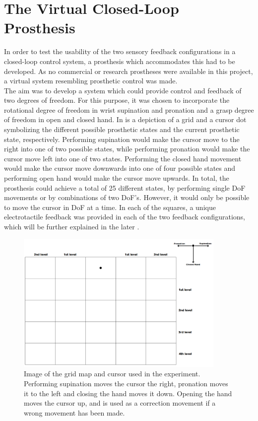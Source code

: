 
\section{The Virtual Closed-Loop Prosthesis} \label{sec:vp}

In order to test the usability of the two sensory feedback configurations in a closed-loop control system, a prosthesis which accommodates this had to be developed. As no commercial or research prostheses were available in this project, a virtual system resembling prosthetic control was made. \\
The aim was to develop a system which could provide control and feedback of two degrees of freedom. For this purpose, it was chosen to incorporate the rotational degree of freedom in wrist supination and pronation and a grasp degree of freedom in open and closed hand. In  is a depiction of a grid and a cursor dot symbolizing the different possible prosthetic states and the current prosthetic state, respectively. Performing supination would make the cursor move to the right into one of two possible states, while performing pronation would make the cursor move left into one of two states. Performing the closed hand movement would make the cursor move downwards into one of four possible states and performing open hand would make the cursor move upwards. In total, the prosthesis could achieve a total of 25 different states, by performing single DoF movements or by combinations of two DoF's. However, it would only be possible to move the cursor in DoF at a time. In each of the squares, a unique electrotactile feedback was provided in each of the two feedback configurations, which will be further explained in the later .      
     

\begin{figure}[H]                 
	\includegraphics[width=0.9\textwidth]{figures/gridmap2}  
	\caption{Image of the grid map and cursor used in the experiment. Performing supination moves the cursor the right, pronation moves it to the left and closing the hand moves it down. Opening the hand moves the cursor up, and is used as a correction movement if a wrong movement has been made.}
	\label{fig:meth:gridmap} 
\end{figure}

